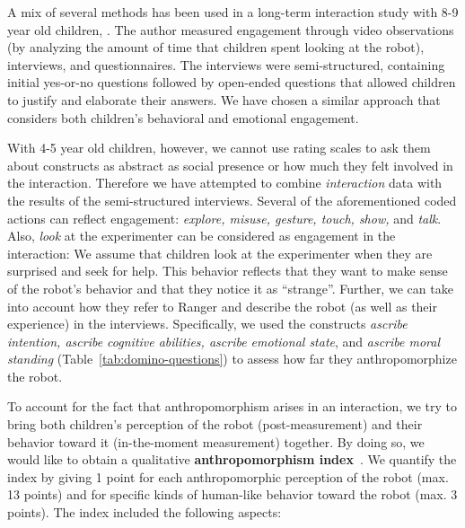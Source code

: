 \documentclass{sig-alternate}
\begin{document}
A mix of several methods has been used in a long-term interaction study with 8-9
year old children, \cite{leite_long-term_2013}. The author measured engagement
through video observations (by analyzing the amount of time that children spent
looking at the robot), interviews, and questionnaires. The interviews were
semi-structured, containing initial yes-or-no questions followed by open-ended
questions that allowed children to justify and elaborate their answers. We have
chosen a similar approach that considers both children's behavioral and
emotional engagement.

With 4-5 year old children, however, we cannot use rating scales to ask them
about constructs as abstract as social presence or how much they felt involved
in the interaction. Therefore we have attempted to combine \emph{interaction}
data with the results of the semi-structured interviews.  Several of the
aforementioned coded actions can reflect engagement: \textit{explore, misuse,
gesture, touch, show,} and \textit{talk}. Also, \textit{look} at the
experimenter can be considered as engagement in the interaction: We assume that
children look at the experimenter when they are surprised and seek for help.
This behavior reflects that they want to make sense of the robot's behavior and
that they notice it as ``strange''. Further, we can take into account how they
refer to Ranger and describe the robot (as well as their experience) in the
interviews.  Specifically, we used the constructs \textit{ascribe intention,
    ascribe cognitive abilities, ascribe emotional state}, and \textit{ascribe
    moral standing} (Table~\ref{tab:domino-questions}) to assess how far they
    anthropomorphize the robot.

To account for the fact that anthropomorphism arises in an interaction, we try
to bring both children's perception of the robot (post-measurement) and their
behavior toward it (in-the-moment measurement) together. By doing so, we would
like to obtain a qualitative \textbf{anthropomorphism
index}~\cite{fink2014dynamics}. We quantify the index by giving 1 point for each
anthropomorphic perception of the robot (max.  13 points) and for specific kinds
of human-like behavior toward the robot (max.  3 points). The index included the
following aspects:\\
\end{document}
